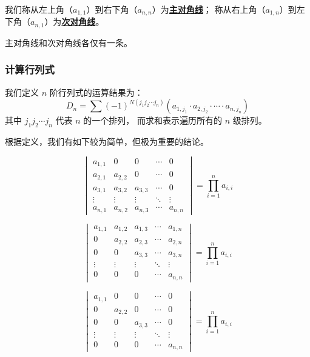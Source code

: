 \documentclass[UTF8]{article}
\begin{document}
	我们称从左上角（$a_{1, 1}$）到右下角（$a_{n, n}$）为\textbf{\uline{主对角线}}；
	称从右上角（$a_{1, n}$）到左下角（$a_{n, 1}$）为\textbf{\uline{次对角线}}。

	主对角线和次对角线各仅有一条。

	\subsubsection{计算行列式}

	我们定义 $n$ 阶行列式的运算结果为：
	\begin{equation*}
		D_n =
		\sum (-1)^{N(j_1 j_2 \cdots j_n)}
		(a_{1, j_1} \cdot a_{2, j_2} \cdot \cdots \cdot a_{n, j_n})
	\end{equation*}
	其中 $j_1 j_2 \cdots j_n$ 代表 $n$ 的一个排列，
	而求和表示遍历所有的 $n$ 级排列。

	\bigskip

	根据定义，我们有如下较为简单，但极为重要的结论。

	\begin{equation*}
		\begin{vmatrix}
			a_{1, 1} & 0 & 0 & \cdots & 0
			\\
			a_{2, 1} & a_{2, 2} & 0 & \cdots & 0
			\\
			a_{3, 1} & a_{3, 2} & a_{3, 3} & \cdots & 0
			\\
			\vdots & \vdots & \vdots & \ddots & \vdots
			\\
			a_{n, 1} & a_{n, 2} & a_{n, 3} & \cdots & a_{n, n}
		\end{vmatrix}
		=
		\prod_{i = 1}^{n} a_{i, i}
	\end{equation*}
	\bigskip

	\begin{equation*}
		\begin{vmatrix}
			a_{1, 1} & a_{1, 2} & a_{1, 3} & \cdots & a_{1, n}
			\\
			0 & a_{2, 2} & a_{2, 3} & \cdots & a_{2, n}
			\\
			0 & 0 & a_{3, 3} & \cdots & a_{3, n}
			\\
			\vdots & \vdots & \vdots & \ddots & \vdots
			\\
			0 & 0 & 0 & \cdots & a_{n, n}
		\end{vmatrix}
		=
		\prod_{i = 1}^{n} a_{i, i}
	\end{equation*}
	\bigskip

	\begin{equation*}
		\begin{vmatrix}
			a_{1, 1} & 0 & 0 & \cdots & 0
			\\
			0 & a_{2, 2} & 0 & \cdots & 0
			\\
			0 & 0 & a_{3, 3} & \cdots & 0
			\\
			\vdots & \vdots & \vdots & \ddots & \vdots
			\\
			0 & 0 & 0 & \cdots & a_{n, n}
		\end{vmatrix}
		=
		\prod_{i = 1}^{n} a_{i, i}
	\end{equation*}
	\bigskip
\end{document}
